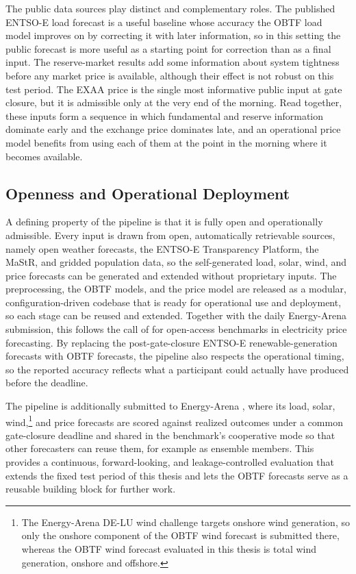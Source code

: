 The public data sources play distinct and complementary roles. The published
\mbox{ENTSO-E} load forecast is a useful baseline whose accuracy the
OBTF load model improves on by correcting it with later information, so
in this setting the public forecast is more useful as a starting point for
correction than as a final input. The reserve-market results add some information about system tightness
before any market price is available, although their effect is not robust on
this test period. The EXAA price is the single most informative
public input at gate closure, but it is admissible only at the very end of the
morning. Read together, these inputs form a sequence in which fundamental and
reserve information dominate early and the exchange price dominates late, and an
operational price model benefits from using each of them at the point in the
morning where it becomes available.

\subsection{Openness and Operational Deployment}

A defining property of the pipeline is that it is fully open and operationally
admissible. Every input is drawn from open, automatically retrievable sources,
namely open weather forecasts, the \mbox{ENTSO-E} Transparency Platform, the
MaStR, and gridded population data, so the self-generated load,
solar, wind, and price forecasts can be generated and extended without
proprietary inputs. The preprocessing, the OBTF models, and the price model
are released as a modular, configuration-driven codebase that is ready for
operational use and deployment, so each stage can be reused and extended.
Together with the daily Energy-Arena submission, this follows the call of
\textcite{lago2021forecasting} for open-access benchmarks in electricity price
forecasting. By replacing the
post-gate-closure \mbox{ENTSO-E} renewable-generation forecasts with
OBTF forecasts, the pipeline also respects the operational timing,
so the reported accuracy reflects what a participant could actually have
produced before the deadline.

The pipeline is additionally submitted to Energy-Arena \cite{kleinebrahm2026energyarena}, where its load, solar, wind,\footnote{The Energy-Arena
\mbox{DE-LU} wind challenge targets onshore wind generation, so only the onshore
component of the OBTF wind forecast is submitted there, whereas the OBTF wind forecast evaluated in this thesis is total wind generation, onshore and
offshore.} and price forecasts are
scored against realized outcomes under a common gate-closure deadline and shared
in the benchmark's cooperative mode so that other forecasters can reuse them, for
example as ensemble members. This provides a continuous, forward-looking, and
leakage-controlled evaluation that extends the fixed test period of this thesis
and lets the OBTF forecasts serve as a reusable building block for further
work.

